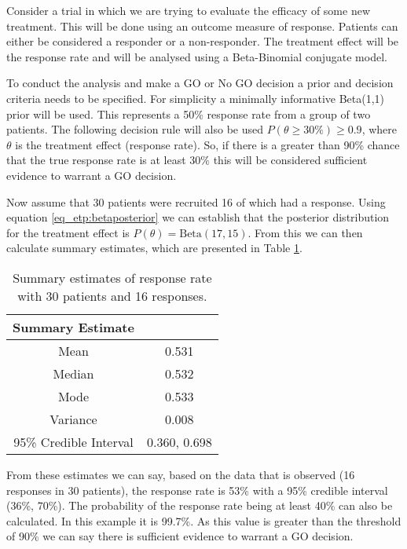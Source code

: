 Consider a trial in which we are trying to evaluate the efficacy of some new treatment. This will be done using an outcome measure of response. Patients can either be considered a responder or a non-responder. The treatment effect will be the response rate and will be analysed using a Beta-Binomial conjugate model. 

To conduct the analysis and make a GO or No GO decision a prior and decision criteria needs to be specified. For simplicity a minimally informative Beta(1,1) prior will be used. This represents a 50\% response rate from a group of two patients. The following decision rule will also be used $P(\theta  \geq 30\%) \geq 0.9$, where $\theta$ is the treatment effect (response rate). So, if there is a greater than  90\% chance that the true response rate is at least 30\% this will be considered sufficient evidence to warrant a GO decision. 

Now assume that 30 patients were recruited 16 of which had a response. Using equation \ref{eq_etp:betaposterior} we can establish that the posterior distribution for the treatment effect is $P(\theta) = \text{Beta}(17, 15)$. From this we can then calculate summary estimates, which are presented in Table \ref{tab_etp:bb_sum_est}.

\begin{table}[H]
	\centering
	\caption{Summary estimates of response rate with 30 patients and 16 responses. }
	\label{tab_etp:bb_sum_est}
	\begin{tabular}{cc}
		\hline
		\textbf{Summary Estimate}                   &              \\ \hline
		\multicolumn{1}{c|}{Mean}                   & 0.531        \\
		\multicolumn{1}{c|}{Median}                 & 0.532       \\
		\multicolumn{1}{c|}{Mode}                   & 0.533          \\
		\multicolumn{1}{c|}{Variance}               & 0.008        \\
		\multicolumn{1}{c|}{95\% Credible Interval} & 0.360, 0.698 \\ \hline
	\end{tabular}
\end{table}

From these estimates we can say, based on the data that is observed (16 responses in 30 patients), the response rate is 53\% with a 95\% credible interval (36\%, 70\%). The probability of the response rate being at least 40\% can also be calculated. In this example it is 99.7\%. As this value is greater than the threshold of 90\%  we can say there is sufficient evidence to warrant a GO decision.

